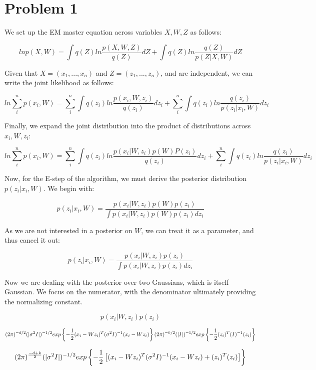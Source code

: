 \documentclass[twoside,11pt]{homework}
\begin{document}
\maketitle

\section*{Problem 1}

We set up the EM master equation across variables $X, W, Z$ as follows:

\[
ln p(X,W) =
\int q(Z) ln \frac{p(X, W, Z)}{q(Z)} dZ +
\int q(Z) ln \frac{q(Z)}{p(Z|X,W)} dZ
\]

Given that $X = (x_1, ..., x_n)$ and $Z = (z_1, ..., z_n)$, and are independent, we can write the joint likelihood as follows:

\[
ln \sum_i^n p(x_i,W) =
\sum_i^n \int q(z_i) ln \frac{p(x_i, W, z_i)}{q(z_i)} dz_i +
\sum_i^n \int q(z_i) ln \frac{q(z_i)}{p(z_i|x_i,W)} dz_i
\]

Finally, we expand the joint distribution into the product of distributions across $x_i, W, z_i$:

\[
ln \sum_i^n p(x_i,W) =
\sum_i^n \int q(z_i) ln \frac{p(x_i|W, z_i)p(W)P(z_i)}{q(z_i)} dz_i +
\sum_i^n \int q(z_i) ln \frac{q(z_i)}{p(z_i|x_i,W)} dz_i
\]

Now, for the E-step of the algorithm, we must derive the posterior distribution $p(z_i|x_i, W)$. We begin with:

\[
p(z_i|x_i, W) =
\frac{
p(x_i|W, z_i)p(W)p(z_i)
}{
\int p(x_i|W, z_i)p(W)p(z_i) dz_i
}
\]

As we are not interested in a posterior on $W$, we can treat it as a parameter, and thus cancel it out:

\[
p(z_i|x_i, W) =
\frac{
p(x_i|W, z_i)p(z_i)
}{
\int p(x_i|W, z_i)p(z_i) dz_i
}
\]

Now we are dealing with the posterior over two Gaussians, which is itself Gaussian. We focus on the numerator, with the denominator ultimately providing the normalizing constant.

\[
p(x_i|W, z_i)p(z_i)
\]

\[
(2\pi)^{-d/2}(|\sigma^2 I|)^{-1/2}exp\left\{-\frac{1}{2}(x_i-Wz_i)^T(\sigma^2I)^{-1}(x_i-Wz_i)\right\}
(2\pi)^{-k/2}(|I|)^{-1/2}exp\left\{-\frac{1}{2}(z_i)^T(I)^{-1}(z_i)\right\}
\]

\[
(2\pi)^\frac{-d+k}{2}(|\sigma^2 I|)^{-1/2}exp\left\{-\frac{1}{2}\left[(x_i-Wz_i)^T(\sigma^2I)^{-1}(x_i-Wz_i) + (z_i)^T(z_i)\right]\right\}
\]
\end{document}
